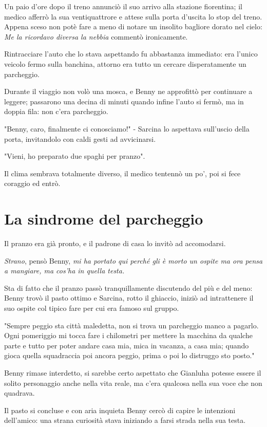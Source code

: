 Un paio d'ore dopo il treno annunciò il suo arrivo alla stazione fiorentina; il medico afferrò la sua ventiquattrore e attese sulla porta d'uscita lo stop del treno. Appena sceso non potè fare a meno di notare un insolito bagliore dorato nel cielo: \textit{Me la ricordavo diversa la nebbia} commentò ironicamente.

Rintracciare l'auto che lo stava aspettando fu abbastanza immediato: era l'unico veicolo fermo sulla banchina, attorno era tutto un cercare disperatamente un parcheggio.

Durante il viaggio non volò una mosca, e Benny ne approfittò per continuare a leggere; passarono una decina di minuti quando infine l'auto si fermò, ma in doppia fila: non c'era parcheggio.

"Benny, caro, finalmente ci conosciamo!" - Sarcina lo aspettava sull'uscio della porta, invitandolo con caldi gesti ad avvicinarsi.

"Vieni, ho preparato due spaghi per pranzo".

Il clima sembrava totalmente diverso, il medico tentennò un po', poi si fece coraggio ed entrò.

\section{La sindrome del parcheggio}

Il pranzo era già pronto, e il padrone di casa lo invitò ad accomodarsi.

\textit{Strano}, pensò Benny, \textit{mi ha portato qui perché gli è morto un ospite ma ora pensa a mangiare, ma cos'ha in quella testa.}

Sta di fatto che il pranzo passò tranquillamente discutendo del più e del meno: Benny trovò il pasto ottimo e Sarcina, rotto il ghiaccio, iniziò ad intrattenere il suo ospite col tipico fare per cui era famoso sul gruppo.

"Sempre peggio sta città maledetta, non si trova un parcheggio manco a pagarlo. Ogni pomeriggio mi tocca fare i chilometri per mettere la macchina da qualche parte e tutto per poter andare casa mia, mica in vacanza, a casa mia; quando gioca quella squadraccia poi ancora peggio, prima o poi lo distruggo sto posto."

Benny rimase interdetto, si sarebbe certo aspettato che Gianluha potesse essere il solito personaggio anche nella vita reale, ma c'era qualcosa nella sua voce che non quadrava.

Il pasto si concluse e con aria inquieta Benny cercò di capire le intenzioni dell'amico: una strana curiosità stava iniziando a farsi strada nella sua testa.

